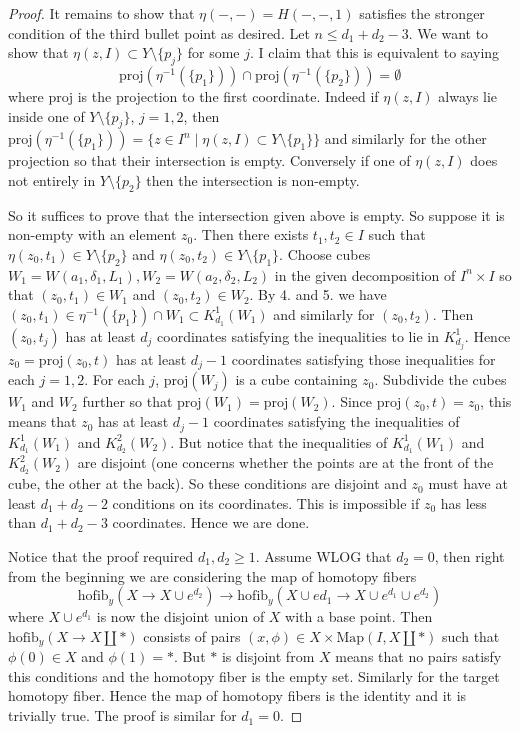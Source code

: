 \begin{lmm}{}{}
\begin{proof}
It remains to show that $\eta(-,-)=H(-,-,1)$ satisfies the stronger condition of the third bullet point as desired. Let $n\leq d_1+d_2-3$. We want to show that $\eta(z,I)\subset Y\setminus\{p_j\}$ for some $j$. I claim that this is equivalent to saying $$\text{proj}\left(\eta^{-1}(\{p_1\})\right)\cap\text{proj}\left(\eta^{-1}(\{p_2\})\right)=\emptyset$$ where $\text{proj}$ is the projection to the first coordinate. Indeed if $\eta(z,I)$ always lie inside one of $Y\setminus\{p_j\}$, $j=1,2$, then $\text{proj}\left(\eta^{-1}(\{p_1\})\right)=\{z\in I^n\;|\;\eta(z,I)\subset Y\setminus\{p_1\}\}$ and similarly for the other projection so that their intersection is empty. Conversely if one of $\eta(z,I)$ does not entirely in $Y\setminus\{p_2\}$ then the intersection is non-empty. 

So it suffices to prove that the intersection given above is empty. So suppose it is non-empty with an element $z_0$. Then there exists $t_1,t_2\in I$ such that $\eta(z_0,t_1)\in Y\setminus\{p_2\}$ and $\eta(z_0,t_2)\in Y\setminus\{p_1\}$. Choose cubes $W_1=W(a_1,\delta_1,L_1),W_2=W(a_2,\delta_2,L_2)$ in the given decomposition of $I^n\times I$ so that $(z_0,t_1)\in W_1$ and $(z_0,t_2)\in W_2$. By 4. and 5. we have $(z_0,t_1)\in\eta^{-1}(\{p_1\})\cap W_1\subset  K_{d_1}^1(W_1)$ and similarly for $(z_0,t_2)$. Then $(z_0,t_j)$ has at least $d_j$ coordinates satisfying the inequalities to lie in $K_{d_j}^1$. Hence $z_0=\text{proj}(z_0,t)$ has at least $d_j-1$ coordinates satisfying those inequalities for each $j=1,2$. For each $j$, $\text{proj}(W_j)$ is a cube containing $z_0$. Subdivide the cubes $W_1$ and $W_2$ further so that $\text{proj}(W_1)=\text{proj}(W_2)$. Since $\text{proj}(z_0,t)=z_0$, this means that $z_0$ has at least $d_j-1$ coordinates satisfying the inequalities of $K_{d_1}^1(W_1)$ and $K_{d_2}^2(W_2)$. But notice that the inequalities of $K_{d_1}^1(W_1)$ and $K_{d_2}^2(W_2)$ are disjoint (one concerns whether the points are at the front of the cube, the other at the back). So these conditions are disjoint and $z_0$ must have at least $d_1+d_2-2$ conditions on its coordinates. This is impossible if $z_0$ has less than $d_1+d_2-3$ coordinates. Hence we are done. 

Notice that the proof required $d_1,d_2\geq 1$. Assume WLOG that $d_2=0$, then right from the beginning we are considering the map of homotopy fibers $$\text{hofib}_y(X\to X\cup e^{d_2})\to\text{hofib}_y(X\cup e{d_1}\to X\cup e^{d_1}\cup e^{d_2})$$ where $X\cup e^{d_1}$ is now the disjoint union of $X$ with a base point. Then $\text{hofib}_y(X\to X\amalg\ast)$ consists of pairs $(x,\phi)\in X\times\text{Map}(I,X\amalg\ast)$ such that $\phi(0)\in X$ and $\phi(1)=\ast$. But $\ast$ is disjoint from $X$ means that no pairs satisfy this conditions and the homotopy fiber is the empty set. Similarly for the target homotopy fiber. Hence the map of homotopy fibers is the identity and it is trivially true. The proof is similar for $d_1=0$. 
\end{proof}
\end{lmm}


